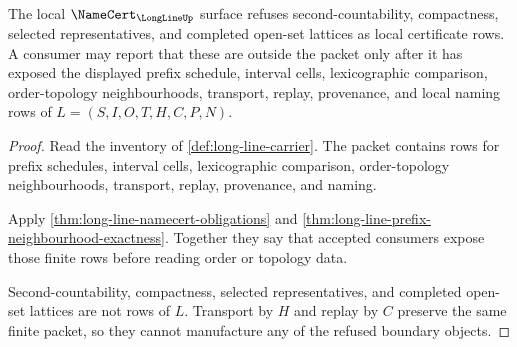 \begin{theorem}
\label{thm:longline-nonsecondcountable-boundary-obligation}
The local $\NameCert_{\LongLineUp}$ surface refuses second-countability, compactness, selected representatives, and completed open-set lattices as local certificate rows. A consumer may report that these are outside the packet only after it has exposed the displayed prefix schedule, interval cells, lexicographic comparison, order-topology neighbourhoods, transport, replay, provenance, and local naming rows of $L=(S,I,O,T,H,C,P,N)$.
\end{theorem}
\begin{proof}
Read the inventory of \autoref{def:long-line-carrier}. The packet contains rows for prefix schedules, interval cells, lexicographic comparison, order-topology neighbourhoods, transport, replay, provenance, and naming.

Apply \autoref{thm:long-line-namecert-obligations} and \autoref{thm:long-line-prefix-neighbourhood-exactness}. Together they say that accepted consumers expose those finite rows before reading order or topology data.

Second-countability, compactness, selected representatives, and completed open-set lattices are not rows of $L$. Transport by $H$ and replay by $C$ preserve the same finite packet, so they cannot manufacture any of the refused boundary objects.
\end{proof}




